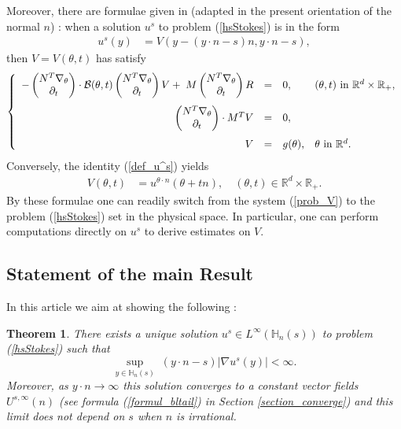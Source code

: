 \documentclass[11pt, reqno]{amsart}
\newtheorem{theorem}{Theorem}[section]
\theoremstyle{definition}
\theoremstyle{remark}
\numberwithin{equation}{section}
\newcommand{\D}{ \left(\!\!\! 
	\begin{array}{c}
		N^T \nabla_{\theta} \\
		\partial_t
	\end{array}
	\!\!\!\right)}
\begin{document}
\noindent	Moreover, there are  formulae given in \cite{regul_hmgnized_data} (adapted in the present orientation of the normal $n$) :
	when  a solution $u^s$   to problem (\ref{hsStokes})
	is in the form
		\begin{align}
			u^s(y)&=V(y-(y\cdot n- s)n,y\cdot n- s)\label{def_u^s},
		\end{align} 
		 then $V=V(\theta,t)$ has satisfy
 	\begin{equation}\label{prob_V}
		\left\{
		\begin{array}{rcll}
			\vspace{.1in}
			-\D\cdot \bigB(\theta, t) \D V +\;  M\D R&=& 0, &(\theta,t) \mbox{ in }\mathbb{R}^d\times \mathbb{R}_+,\\
			\vspace{.1in}
			\D\cdot M^T V&=& 0 ,\\
			V&=& g (\theta),   &\theta\mbox{ in }\mathbb{R}^d.
		\end{array}       
		\right. 
	\end{equation} 
	Conversely, the identity (\ref{def_u^s}) yields
		\begin{align}
		V(\theta,t)&=u^{\theta\cdot n}(\theta+t n),\quad (\theta,t)\in \mathbb{R}^d\times \mathbb{R}_+.\label{def_Vtheta,t}
	\end{align} 
		By these formulae one can readily switch from the system (\ref{prob_V}) 
	to the  problem (\ref{hsStokes}) set in the physical space.
	In particular, one can perform computations directly on $u^s$ to derive   estimates on $V$.
	
	\subsection{Statement of the main Result}
	\noindent	In this article we aim at showing the following :
	\begin{theorem}\label{intro_ThConverge}
	There exists a unique solution $u^s\in L^\infty(\mathbb{H}_n(s) )$ to problem \textup{(\ref{hsStokes})} such that 
  \begin{equation}\label{class}
      \sup_{y\in\mathbb{H}_n(s)} \;  (y\cdot n - s) |\nabla u^s (y)| <\infty.
  \end{equation}
Moreover, as  $y\cdot n \rightarrow \infty$	this solution  converges to a constant vector fields $U^{s,\infty}(n)$ \textup{(}see formula \textup{
(\ref{formul_bltail})} in  \textup{Section  \ref{section_converge}}\textup{)} and  this limit does not depend on $s$ when $n$ is irrational.
	\end{theorem}
	
\end{document}
